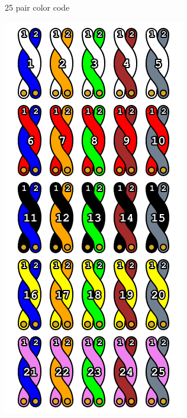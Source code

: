 \documentclass[landscape,fontscale=1,margin=0.2cm,paperwidth=70truecm, paperheight=40truecm,debug]{baposter}
\begin{document}
\begin{poster}
\begin{posterbox}[column=4]{25 pair color code}
\begin{description}
\end{description}
\begin{center}
\includegraphics[scale=0.5]{25_pair_color_code_chart.png}
\end{center}
\end{posterbox}


\end{poster}
\end{document}
